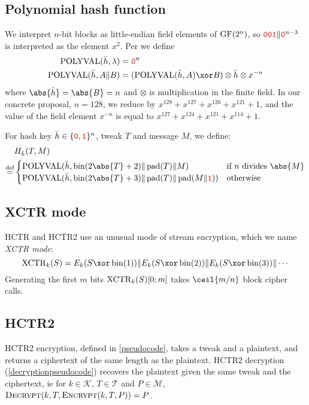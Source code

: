 \documentclass[hctr2.tex]{subfiles}
\begin{document}
\subsection{Polynomial hash function}\label{hashspec}
We interpret \(n\)-bit blocks as little-endian field elements of \(\operatorname{GF}(2^n)\),
so \(\binary{001} \Concat \bino^{n-3}\) is interpreted as the element \(x^2\).
Per \cite{aes_gcm_siv,aes_gcm_siv_rfc} we define
\begin{align*}
    \POLYVAL(\hgen, \lambda) & = \bino^n\\
    \POLYVAL(\hgen, A \Concat B) & = (\POLYVAL(\hgen, A) \xor B) \otimes \hgen \otimes x^{-n}
\end{align*}
where \(\abs{\hgen} = \abs{B} = n\) and
\(\otimes\) is multiplication in the finite field.
In our concrete proposal, \(n=128\), we reduce by
\(x^{128} + x^{127} + x^{126} + x^{121} + 1\),
and the value of the field element \(x^{-n}\)
is equal to \(x^{127} + x^{124} + x^{121} + x^{114} + 1\).

For hash key \(\hgen \in \bin^n\), tweak \(T\) and message \(M\), we define:
\begin{align*}
    & H_{\hgen}(T, M) \\
    \defeq & 
    \begin{cases}
        \POLYVAL(\hgen, \fromint(2\abs{T} + 2) \Concat \pad(T) \Concat M) &
        \text{if } n \text{ divides } \abs{M} \\
        \POLYVAL(\hgen, \fromint(2\abs{T} + 3) \Concat \pad(T) \Concat \pad(M \Concat \bini)) &
        \text{otherwise}
    \end{cases}
\end{align*}

\subsection{XCTR mode}
HCTR and HCTR2 use an unusual mode of stream encryption,
which we name \emph{XCTR mode}:
\begin{displaymath}
    \XCTR_k(S) = E_k(S \xor \fromint(1)) \Concat E_k(S \xor \fromint(2)) \Concat E_k(S \xor \fromint(3)) \Concat \cdots
\end{displaymath}
Generating the first \(m\) bits \(\operatorname{XCTR}_k(S)[0; m]\) takes \(\ceil{m/n}\) block cipher calls. 

\subsection{HCTR2}
HCTR2 encryption, defined in \autoref{pseudocode},
takes a tweak and a plaintext,
and returns a ciphertext of the same length as the plaintext.
HCTR2 decryption (\autoref{decryptionpseudocode})
recovers the plaintext given the same tweak and the ciphertext, ie
for \(k \in \mathcal{K}\), \(T \in \mathcal{T}\)
and \(P \in \mathcal{M}\),
\(\textsc{Decrypt}(k, T, \textsc{Encrypt}(k, T, P)) = P\).
\end{document}
